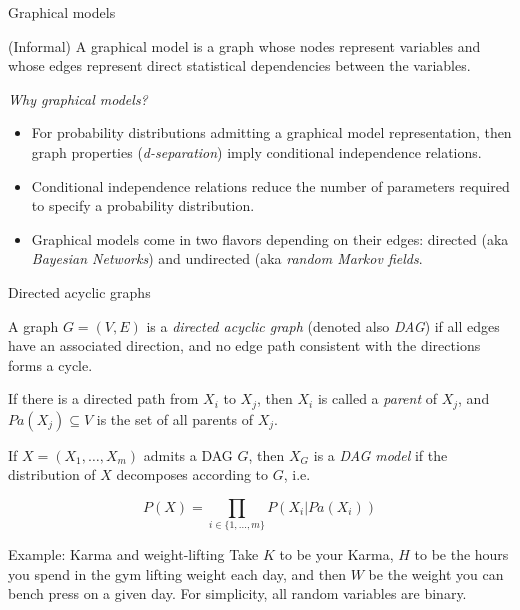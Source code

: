 \begin{frame}{Graphical models}
  \begin{definition}
    (Informal) A graphical model is a graph whose nodes represent variables and whose edges represent direct statistical dependencies between the variables.\newline
  \end{definition}

  \emph{Why graphical models?}
  \begin{itemize}
    \item For probability distributions admitting a graphical model representation, then graph properties (\emph{d-separation}) imply conditional independence relations.
    \item Conditional independence relations reduce the number of parameters required to specify a probability distribution.
    \item Graphical models come in two flavors depending on their edges: directed (aka \emph{Bayesian Networks}) and undirected (aka \emph{random Markov fields}.
  \end{itemize}
\end{frame}

\begin{frame}{Directed acyclic graphs}
  \begin{definition}
    A graph $G = (V, E)$ is a \emph{directed acyclic graph} (denoted also \emph{DAG}) if all edges have an associated direction, and no edge path consistent with the directions forms a cycle.\newline

    If there is a directed path from $X_i$ to $X_j$, then $X_i$ is called a \emph{parent} of $X_j$, and $Pa(X_j) \subseteq V$ is the set of all parents of $X_j$.
  \end{definition}

  \begin{definition}
    If $X = (X_1, \ldots, X_m)$ admits a DAG $G$, then $X_G$ is a \emph{DAG model} if the distribution of $X$ decomposes according to $G$, i.e.

    \begin{equation*}
      P(X) = \prod_{i \in \{1, \ldots, m\}} P(X_i | Pa(X_i))
    \end{equation*}
  \end{definition}
\end{frame}


\begin{frame}{Example: Karma and weight-lifting}
  Take $K$ to be your Karma, $H$ to be the hours you spend in the gym lifting weight each day, and then $W$ be the weight you can bench press on a given day. For simplicity, all random variables are binary.\newline

  \newline
\end{frame}


